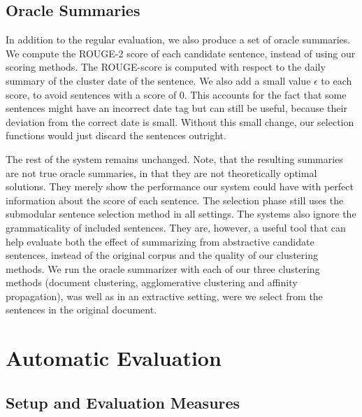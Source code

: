 \documentclass[a4paper,BCOR=10mm]{report}
\numberwithin{lemma}{chapter}
\numberwithin{definition}{chapter}
\begin{document}
%
%

\section{Oracle Summaries}

In addition to the regular evaluation, we also produce a set of oracle summaries. We compute the ROUGE-2 score of each candidate sentence, instead of using our scoring methods. The ROUGE-score is computed with respect to the daily summary of the cluster date of the sentence. We also add a small value $\epsilon$ to each score, to avoid sentences with a score of 0. This accounts for the fact that some sentences might have an incorrect date tag but can still be useful, because their deviation from the correct date is small. Without this small change, our selection functions would just discard the sentences outright.

The rest of the system remains unchanged. Note, that the resulting summaries are not true oracle summaries, in that they are not theoretically optimal solutions. They merely show the performance our system could have with perfect information about the score of each sentence. The selection phase still uses the submodular sentence selection method in all settings. The systems also ignore the grammaticality of included sentences.
They are, however, a useful tool that can help evaluate both the effect of summarizing from abstractive candidate sentences, instead of the original corpus and the quality of our clustering methods.
We run the oracle summarizer with each of our three clustering methods (document clustering, agglomerative clustering and affinity propagation), was well as in an extractive setting, were we select from the sentences in the original document.

\chapter{Automatic Evaluation} \label{sec:results-auto}

\section{Setup and Evaluation Measures}
\end{document}
